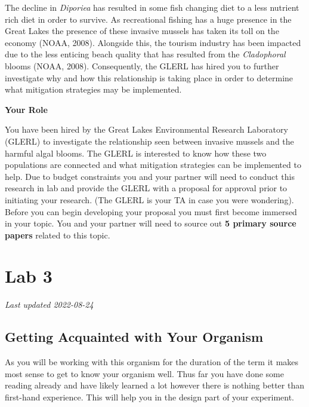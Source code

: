 \documentclass[
]{book}
\begin{document}
The decline in \emph{Diporiea} has resulted in some fish changing diet to a less nutrient rich diet in order to survive. As recreational fishing has a huge presence in the Great Lakes the presence of these invasive mussels has taken its toll on the economy (NOAA, 2008). Alongside this, the tourism industry has been impacted due to the less enticing beach quality that has resulted from the \emph{Cladophoral} blooms (NOAA, 2008). Consequently, the GLERL has hired you to further investigate why and how this relationship is taking place in order to determine what mitigation strategies may be implemented.

\textbf{Your Role}

You have been hired by the Great Lakes Environmental Research Laboratory (GLERL) to investigate the relationship seen between invasive mussels and the harmful algal blooms. The GLERL is interested to know how these two populations are connected and what mitigation strategies can be implemented to help. Due to budget constraints you and your partner will need to conduct this research in lab and provide the GLERL with a proposal for approval prior to initiating your research. (The GLERL is your TA in case you were wondering). Before you can begin developing your proposal you must first become immersed in your topic. You and your partner will need to source out \textbf{5 primary source papers} related to this topic.

\hypertarget{part-lab-3}{%
\part*{Lab 3}\label{part-lab-3}}

\emph{Last updated 2022-08-24}

\hypertarget{getting-acquainted-with-your-organism}{%
\chapter*{Getting Acquainted with Your Organism}\label{getting-acquainted-with-your-organism}}

As you will be working with this organism for the duration of the term it makes most sense to get to know your organism well. Thus far you have done some reading already and have likely learned a lot however there is nothing better than first-hand experience. This will help you in the design part of your experiment.
\end{document}
